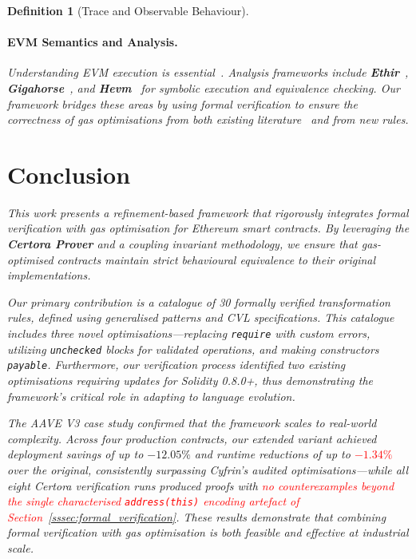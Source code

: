 \documentclass[manuscript,screen,review]{acmart}
\newcommand{\revised}[1]{\textcolor{red}{#1}}
\newtheorem{definition}{Definition}
\begin{document}
\begin{definition}[Trace and Observable Behaviour]
\paragraph{EVM Semantics and Analysis.} Understanding EVM execution is essential~\cite{luu2016making}. Analysis frameworks include \textbf{Ethir}~\cite{albert2018ethir}, \textbf{Gigahorse}~\cite{grech2019gigahorse}, and \textbf{Hevm}~\cite{DxoSP0B24} for symbolic execution and equivalence checking. Our framework bridges these areas by using formal verification to ensure the correctness of gas optimisations from both existing literature~\cite{khanzadeh2023optimizing,NBL21,Nelaturu2021} and from new rules.

\section{Conclusion}
\label{sec:conclusion}

This work presents a refinement-based framework that rigorously integrates
formal verification with gas optimisation for Ethereum smart contracts. By
leveraging the \textbf{Certora Prover} and a coupling invariant methodology,
we ensure that gas-optimised contracts maintain strict behavioural equivalence
to their original implementations.

Our primary contribution is a catalogue of 30 formally verified transformation
rules, defined using generalised patterns and CVL specifications. This catalogue
includes three novel optimisations---replacing \texttt{require} with custom
errors, utilizing \texttt{unchecked} blocks for validated operations, and making
constructors \texttt{payable}. Furthermore, our verification process identified
two existing optimisations requiring updates for Solidity 0.8.0+, thus
demonstrating the framework's critical role in adapting to language evolution.

The AAVE V3 case study confirmed that the framework scales to real-world
complexity. Across four production contracts, our extended variant achieved
deployment savings of up to $-12.05\%$ and runtime reductions of up to
\revised{$-1.34\%$} over the original, consistently surpassing Cyfrin's audited
optimisations---while all eight Certora verification runs produced proofs with
\revised{no counterexamples beyond the single characterised \texttt{address(this)}
encoding artefact of Section~\ref{sssec:formal_verification}}. These results demonstrate that combining formal
verification with gas optimisation is both feasible and effective at
industrial scale.


\end{definition}
\end{document}
